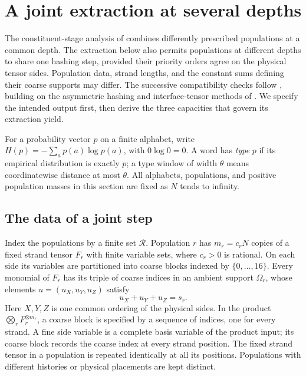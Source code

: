 \section{A joint extraction at several depths}\label{sec:joint}

The constituent-stage analysis of
\cite[Theorem~6.4]{MoreAsymmetry2026} combines differently prescribed
populations at a common depth.  The extraction below also permits
populations at different depths to share one hashing step, provided
their priority orders agree on the physical tensor sides.  Population
data, strand lengths, and the constant sums defining their coarse
supports may differ.  The successive compatibility checks follow
\cite[Section~4.1]{MoreAsymmetry2026}, building on the asymmetric
hashing and interface-tensor methods of
\cite{DuanWuZhou2023,VXXZ2023}.  We specify the intended output first,
then derive the three capacities that govern its extraction yield.

For a probability vector $p$ on a finite alphabet, write
$H(p)=-\sum_a p(a)\log p(a)$, with $0\log0=0$.  A word has
\emph{type} $p$ if its empirical distribution is exactly $p$; a type window
of width $\theta$ means coordinatewise distance at most $\theta$.
All alphabets, populations, and positive population masses in this
section are fixed as $N$ tends to infinity.

\subsection{The data of a joint step}

Index the populations by a finite set $\mathcal R$.  Population $r$ has
$m_r=c_rN$ copies of a fixed strand tensor $F_r$ with finite variable
sets, where $c_r>0$ is rational.  On each side its variables are
partitioned into coarse blocks indexed by $\{0,\ldots,16\}$.
Every monomial of $F_r$ has its triple of coarse indices in an
ambient support $\Omega_r$, whose elements $u=(u_X,u_Y,u_Z)$ satisfy
\begin{equation}\label{eq:coarse-sum}
 u_X+u_Y+u_Z=s_r.
\end{equation}
Here $X,Y,Z$ is one common ordering of the physical sides.  In the
product $\bigotimes_r F_r^{\otimes m_r}$, a coarse block is specified
by a sequence of indices, one for every strand.
A fine side variable is a complete basis variable of the product input;
its coarse block records the coarse index at every strand position.
The fixed strand tensor in a population is repeated identically at
all its positions.  Populations with different histories or physical
placements are kept distinct.

